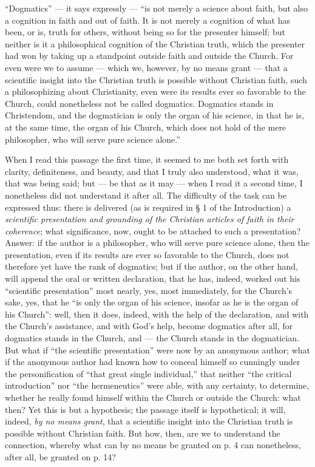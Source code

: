 \documentclass[12pt]{book}
\begin{document}
``Dogmatics'' --- it says expressly --- ``is not merely a science about faith, but also a cognition
in faith and out of faith. It is not merely a cognition of what has been, or is, truth for others, without being so for the presenter himself; but neither is it a philosophical cognition of the Christian truth, which the presenter had won by taking up a standpoint outside faith and outside the Church. For even were we to assume --- which we, however, by no means grant --- that a scientific insight into the Christian truth is possible without Christian faith, such a philosophizing about Christianity, even were its results ever so favorable to the Church, could nonetheless not be called dogmatics. Dogmatics stands in Christendom, and the dogmatician is only the organ of his science, in that he is, at the same time, the organ of his Church, which does not hold of the mere philosopher, who will serve pure science alone.''

When I read this passage the first time, it seemed to me both set forth with clarity, definiteness, and beauty, and that I truly also understood, what it was, that was being said; but --- be that as it may --- when I read it a second time, I nonetheless did not understand it after all. The difficulty of the task can be expressed thus: there is delivered (as is required
in § 1 of the Introduction) a \emph{scientific presentation and grounding of the Christian articles of faith in their coherence}; what significance, now, ought to be attached to such a presentation? Answer: if the author is a philosopher, who will serve pure science alone, then the presentation, even if its results are ever so favorable to the Church, does not
therefore yet have the rank of dogmatics; but if the author, on the other hand, will append the oral or written declaration, that he has, indeed, worked out his ``scientific presentation'' most nearly, yes, most immediately, for the Church's sake, yes, that he ``is only the organ of his science, insofar as he is the organ of his Church'': well, then it does, indeed, with the help of the declaration, and with the Church's assistance, and with God's help, become dogmatics after all, for dogmatics stands in the Church, and --- the Church stands in the dogmatician. But what if ``the scientific presentation'' were now by an anonymous author; what if the anonymous author had known how to conceal himself so cunningly under the personification of ``that great single individual,'' that neither ``the critical introduction'' nor ``the hermeneutics'' were able, with any certainty, to determine, whether he really found himself within the Church or outside the Church: what then? Yet this is but a hypothesis; the passage itself is hypothetical; it will, indeed, \emph{by no means grant}, that a scientific insight into the Christian truth is possible without Christian faith. But how, then, are we to understand the connection, whereby what can by no means be granted on p. 4 can nonetheless, after all, be granted on p. 14?
\end{document}

